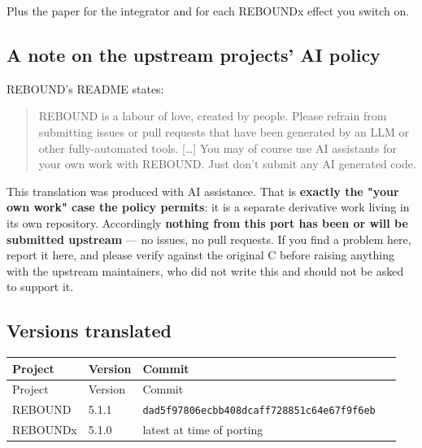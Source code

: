 \documentclass[11pt]{article}
\begin{document}
Plus the paper for the integrator and for each REBOUNDx effect you switch on.

\subsection{A note on the upstream projects' AI policy}

REBOUND's README states:

\begin{quote}
REBOUND is a labour of love, created by people. Please refrain from submitting issues or pull requests that have been generated by an LLM or other fully-automated tools. [\ldots{}] You may of course use AI assistants for your own work with REBOUND. Just don't submit any AI generated code.
\end{quote}

This translation was produced with AI assistance. That is \textbf{exactly the "your own work" case the policy permits}: it is a separate derivative work living in its own repository. Accordingly \textbf{nothing from this port has been or will be submitted upstream} --- no issues, no pull requests. If you find a problem here, report it here, and please verify against the original C before raising anything with the upstream maintainers, who did not write this and should not be asked to support it.

\subsection{Versions translated}

\begin{longtable}{L{0.133\linewidth}L{0.117\linewidth}L{0.700\linewidth}}
\toprule
Project & Version & Commit \\
\midrule
\endfirsthead
\toprule
Project & Version & Commit \\
\midrule
\endhead
REBOUND & 5.1.1 & \texttt{dad5f97806ecbb408dcaff728851c64e67f9f6eb} \\
REBOUNDx & 5.1.0 & latest at time of porting \\
\bottomrule
\end{longtable}
\end{document}
